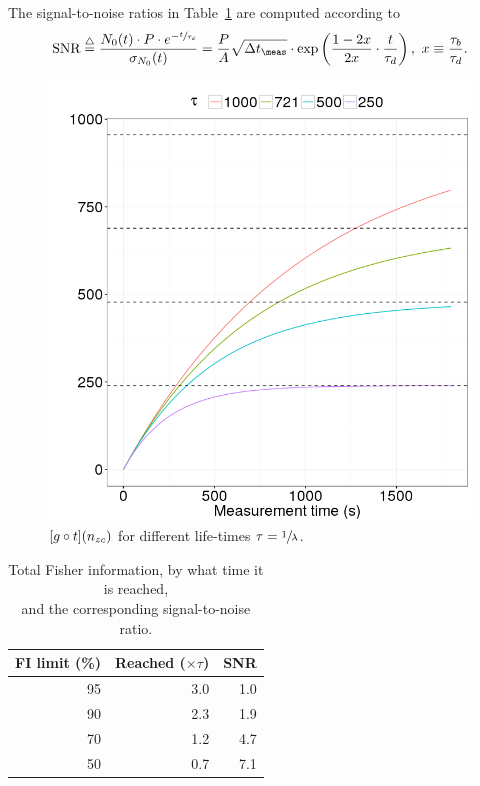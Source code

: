 \documentclass{article}
\begin{document}
\newcommand{\SNR}{\text{SNR}}
\newcommand{\deq}{\overset{\triangle}{=}}
The signal-to-noise ratios in Table~\ref{tbl:FItot} are computed according to
\begin{equation}\label{eq:TauRatioSNR}
\SNR \deq \frac{N_0(t)\cdot P\cdot e^{-\sfrac{t}{\LTd}}}{\SD{N_0}(t)} 
= \frac{P}{A}\sqrt{\dtm}\cdot\exp\bkt{\frac{1-2x}{2x}\cdot\frac{t}{\LTd}},~ x\equiv \frac{\LTb}{\LTd}.
\end{equation}
\begin{figure}[h]
	\centering
	\includegraphics[scale=.5]{img/StatReq/XtotOnTime}
	\caption{$[g\circ t]({n_{zc}})$ for different life-times $\tau = \sfrac1\lambda$.\label{fig:GofT}}
\end{figure}
\begin{table}[h]
	\centering
	\caption{Total Fisher information, by what time it is reached,\\ and the corresponding signal-to-noise ratio.\label{tbl:FItot}}
	\begin{tabular}{rrr}
		\hline
		FI limit (\%) & Reached ($\times\tau$) & SNR \\ \hline
		           95 &                    3.0 & 1.0 \\
		           90 &                    2.3 & 1.9 \\
		           70 &                    1.2 & 4.7 \\
		           50 &                    0.7 & 7.1 \\ \hline
	\end{tabular}
\end{table}
\end{document}
